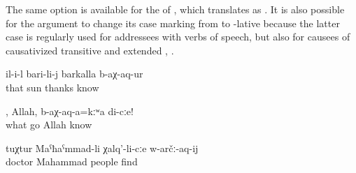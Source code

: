 The same option is available for the  of , which translates as  . It is also possible for the  argument to change its case marking from  to -lative because the latter case is regularly used for addressees with verbs of speech, but also for causees of causativized transitive and extended  , .
%
\begin{exe}
	\ex	\label{ex:‎He thanked the sun}
	\gll	il-i-l	bari-li-j	barkalla	b-aχ-aq-ur\\
		that	sun	thanks	know\\
	\glt	{}

	\ex	\label{ex:Allah, tell me what happened}
	\gll	[ce	ag-ur=el],	Allah,	b-aχ-aq-a=kːʷa	di-cːe!\\
		what	go	Allah	know	\\
	\glt	{}

	\ex	\label{ex:(that) doctor Mahammad makes the people find (him)}
	\gll	tuχtur	Maˁħaˁmmad-li	χalq'-li-cːe	w-arčː-aq-ij\\
		doctor	Mahammad	people	find\\
	\glt	{}
\end{exe}

